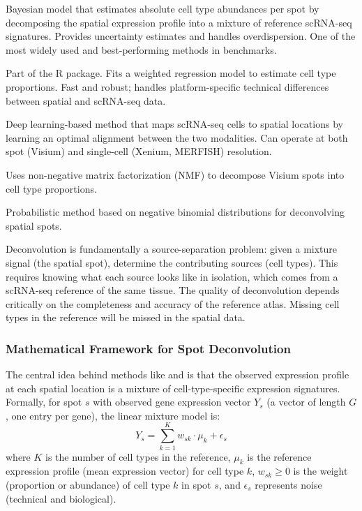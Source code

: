 \begin{description}[style=nextline]
  \item[\software{cell2location}] Bayesian model that estimates absolute cell
    type abundances per spot by decomposing the spatial expression profile into
    a mixture of reference scRNA-seq signatures. Provides uncertainty estimates
    and handles overdispersion. One of the most widely used and best-performing
    methods in benchmarks.
  \item[\software{RCTD} (Robust Cell Type Decomposition)] Part of the
     R package. Fits a weighted regression model to estimate
    cell type proportions. Fast and robust; handles platform-specific technical
    differences between spatial and scRNA-seq data.
  \item[\software{Tangram}] Deep learning-based method that maps scRNA-seq
    cells to spatial locations by learning an optimal alignment between the
    two modalities. Can operate at both spot (Visium) and single-cell (Xenium,
    MERFISH) resolution.
  \item[\software{SPOTlight}] Uses non-negative matrix factorization (NMF) to
    decompose Visium spots into cell type proportions.
  \item[\software{stereoscope}] Probabilistic method based on negative binomial
    distributions for deconvolving spatial spots.
\end{description}

\begin{keyconcept}[title={Why Deconvolution Needs a scRNA-seq Reference}]
Deconvolution is fundamentally a source-separation problem: given a mixture
signal (the spatial spot), determine the contributing sources (cell types).
This requires knowing what each source looks like in isolation, which comes
from a scRNA-seq reference of the same tissue. The quality of deconvolution
depends critically on the completeness and accuracy of the reference atlas.
Missing cell types in the reference will be missed in the spatial data.
\end{keyconcept}

\subsubsection{Mathematical Framework for Spot Deconvolution}
\label{subsec:spatial:deconv_math}

The central idea behind methods like  and
 is that the observed expression profile at each
spatial location is a mixture of cell-type-specific expression signatures.
Formally, for spot $s$ with observed gene expression vector $Y_s$ (a vector of
length $G$, one entry per gene), the linear mixture model is:
\begin{equation}
  \label{eq:spatial:deconv_linear}
  Y_s = \sum_{k=1}^{K} w_{sk} \cdot \mu_k + \epsilon_s
\end{equation}
where $K$ is the number of cell types in the reference, $\mu_k$ is the
reference expression profile (mean expression vector) for cell type $k$,
$w_{sk} \geq 0$ is the weight (proportion or abundance) of cell type $k$ in
spot $s$, and $\epsilon_s$ represents noise (technical and biological).


